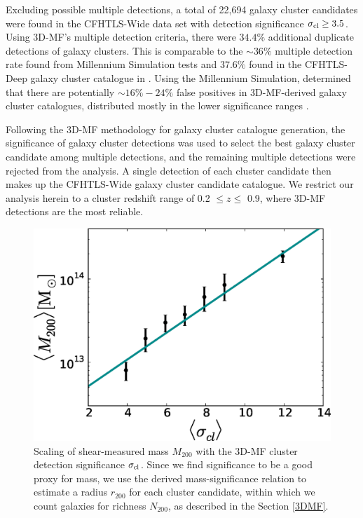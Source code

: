 Excluding possible multiple detections, a total of 22,694 galaxy cluster candidates were found in the \ac{CFHTLS}-Wide data set with detection significance $\sigma_{\rm cl} \ge 3.5$. Using \ac{3D-MF}'s multiple detection criteria, there were $34.4\%$ additional duplicate detections of galaxy clusters. This is comparable to the $\sim 36\%$ multiple detection rate found from Millennium Simulation tests and $37.6\%$ found in the \ac{CFHTLS}-Deep galaxy cluster catalogue in \citet{Milkeraitis10}. Using the Millennium Simulation, \citet{Milkeraitis10} determined that there are potentially $\sim 16\%-24\%$ false positives in \ac{3D-MF}-derived galaxy cluster catalogues, distributed mostly in the lower significance ranges \citep[see Table~3 in][]{Milkeraitis10}.

Following the \ac{3D-MF} methodology for galaxy cluster catalogue generation, the significance of galaxy cluster detections was used to select the best galaxy cluster candidate among multiple detections, and the remaining multiple detections were rejected from the analysis. A single detection of each cluster candidate then makes up the \ac{CFHTLS}-Wide galaxy cluster candidate catalogue. We restrict our analysis herein to a cluster redshift range of 0.2 $\leq z \leq$ 0.9, where \ac{3D-MF} detections are the most reliable.

\begin{figure}
\begin{center}
  \includegraphics[scale=0.7]{plots_ch4/MassSig_relation.eps}
  \caption[Mass-Significance Relation]{Scaling of shear-measured mass $M_{200}$ with the \ac{3D-MF} cluster detection significance $\sigma_{\rm cl}$. Since we find significance to be a good proxy for mass, we use the derived mass-significance relation to estimate a radius $r_{200}$ for each cluster candidate, within which we count galaxies for richness $N_{200}$, as described in the Section \ref{3DMF}.}
\label{plot:masssig} %
\end{center}
\end{figure}

